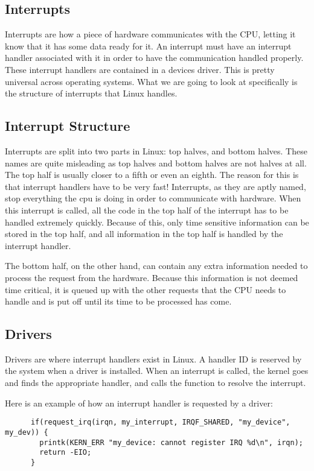   \subsection{Interrupts}
  Interrupts are how a piece of hardware communicates with the CPU, letting it
  know that it has some data ready for it. An interrupt must have an interrupt
  handler associated with it in order to have the communication handled properly.
  These interrupt handlers are contained in a devices driver. This is pretty
  universal across operating systems. What we are going to look at specifically
  is the structure of interrupts that Linux handles. \cite{robertlove2010}

  \subsection{Interrupt Structure}
  Interrupts are split into two parts in Linux: top halves, and bottom halves.
  These names are quite misleading as top halves and bottom halves are not halves
  at all. The top half is usually closer to a fifth or even an eighth. The reason
  for this is that interrupt handlers have to be very fast! Interrupts, as they
  are aptly named, stop everything the cpu is doing in order to communicate with
  hardware. When this interrupt is called, all the code in the top half of the
  interrupt has to be handled extremely quickly. Because of this, only time sensitive
  information can be stored in the top half, and all information in the top half
  is handled by the interrupt handler.

  The bottom half, on the other hand, can contain any extra information needed
  to process the request from the hardware. Because this information is not deemed
  time critical, it is queued up with the other requests that the CPU needs to handle
  and is put off until its time to be processed has come. \cite{robertlove2010}

  \subsection{Drivers}
  Drivers are where interrupt handlers exist in Linux. A handler ID is reserved
  by the system when a driver is installed. When an interrupt is called, the
  kernel goes and finds the appropriate handler, and calls the function to resolve
  the interrupt.

  Here is an example of how an interrupt handler is requested by a driver:
  \begin{lstlisting}
      if(request_irq(irqn, my_interrupt, IRQF_SHARED, "my_device", my_dev)) {
        printk(KERN_ERR "my_device: cannot register IRQ %d\n", irqn);
        return -EIO;
      }
  \end{lstlisting}

